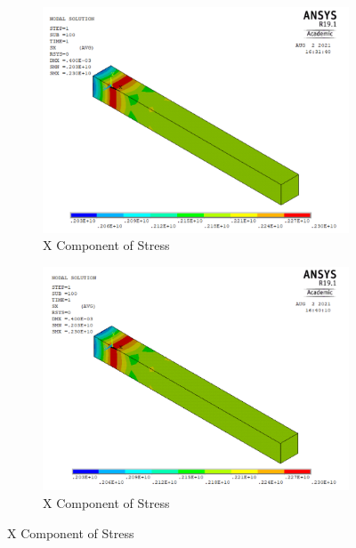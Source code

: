 \documentclass[a4paper,12pt]{extarticle}
\begin{document}
\newpage
\begin{figure}[htbp]
     \begin{subfigure}[b]{0.4\textwidth}
         \centering
         \includegraphics[width=1.1\textwidth]{15.Ansys_SX.png}
         \caption{X Component of Stress}
         \label{fig:X Component of Stress}
     \end{subfigure}
     \hfill
     \begin{subfigure}[b]{0.4\textwidth}
         \centering
         \includegraphics[width=1.1\textwidth]{18.User_SX.png}
         \caption{X Component of Stress}
         \label{fig:X Component of Stress2}
     \end{subfigure}
\end{figure}
\end{document}
